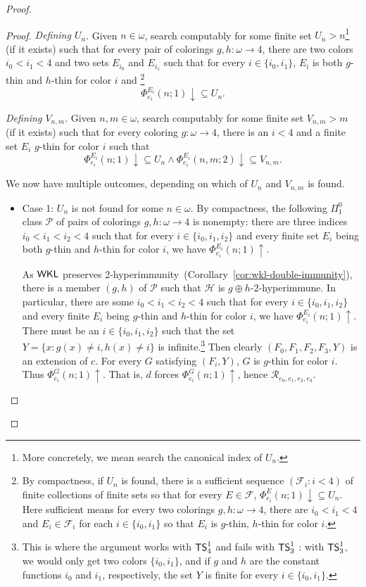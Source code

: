 \documentclass{amsart}
\theoremstyle{definition}
\theoremstyle{remark}
\numberwithin{equation}{section}
\theoremstyle{noparens}
\def\propertyL{2-hyperimmunity}
\def\hyper{2-hyperimmune}
\def\mcal{\mathcal}
\newcommand{\Hcal}{\mathcal{H}}
\newcommand{\Pcal}{\mathcal{P}}
\newcommand{\Rcal}{\mathcal{R}}
\newcommand{\s}[1]{\ensuremath{\sf{#1}}}
\DeclareMathOperator{\wkl}{\s{WKL}}
\DeclareMathOperator{\ts}{\s{TS}}
\begin{document}
\begin{proof}
\begin{proof}
\emph{Defining $U_n$}.
Given $n \in \omega$, search computably for some
finite set $U_n>n$\footnote{More concretely, we mean search the canonical index of $U_n$.} (if it exists) such that
for every pair of colorings
$g,h:\omega\rightarrow 4$, there are two colors $i_0 < i_1 < 4$
and two sets $E_{i_0}$ and $E_{i_1}$ such that for every $i \in \{i_0, i_1 \}$,
$E_i $ is both $g$-thin and $h$-thin for color $i$  and
\footnote{By compactness, if $U_n$ is found, there is a sufficient
sequence $(\mcal{F}_i:i<4)$
of finite  collections
  of finite sets so that for every $E\in\mcal{F}$,
$\Phi_{e_i}^{E}(n;1)\downarrow\subseteq U_n$.
Here sufficient means for every two colorings $g,h:\omega\rightarrow 4$,
there are $i_0<i_1<4$ and $E_i\in\mcal{F}_i$ for each $i\in \{i_0,i_1\}$
so that $E_i$ is $g$-thin, $h$-thin for color $i$. }
$$
\Phi_{e_i}^{   E_i}(n;1) \downarrow \subseteq U_n.
$$

\emph{Defining $V_{n,m}$}. Given $n, m \in \omega$, search  computably for some
finite  set $V_{n,m}>m$ (if it exists) such that for every
coloring $g:\omega\rightarrow 4 $, there is an $i < 4$ and a finite set $E_i $ $g$-thin for color $i$
such that
$$
\Phi_{e_i}^{  E_i}(n;1) \downarrow \subseteq U_n
	\wedge \Phi_{e_i}^{ E_i}(n, m;2) \downarrow \subseteq V_{n,m}.
$$
\smallskip

We now have multiple outcomes, depending on which of $U_n$ and $V_{n,m}$ is found.

\begin{itemize}
	\item Case 1: $U_n$ is not found for some $n \in \omega$. By compactness, the following $\Pi^{0}_1$ class
$\Pcal$ of  pairs of colorings
$g,h:\omega\rightarrow 4$
is nonempty:	
	 there are three indices $i_0 < i_1 < i_2 < 4$ such that for every $i \in \{i_0, i_1, i_2\}$
	and every finite set $E_i$ being both $g$-thin and $h$-thin for color $i$, we have
	$\Phi_{e_i}^{E_i}(n;1) \uparrow$.

	As $\wkl$ preserves \propertyL\
	(Corollary~\ref{cor:wkl-double-immunity}), there is a member $(g,h)$
 of $\Pcal$ such that
	$\Hcal$ is $g\oplus h$-\hyper.
	In particular, there are some $i_0 < i_1 < i_2 < 4$ such that for every $i \in \{i_0, i_1, i_2\}$
	and every  finite $E_i $ being $g$-thin and $h$-thin for color $i$, we have
	$\Phi_{e_i}^{E_i}(n;1) \uparrow$.
	There must be an $i\in \{i_0,i_1,i_2\}$ such that
the set
$Y=\{x:g(x)\ne i,h(x)\ne i\}$ is infinite.\footnote{This is where the argument works with $\ts^1_4$ and fails with $\ts^1_3$ : with $\ts^1_3$, we would only get two colors $\{i_0, i_1\}$, and if $g$ and $h$ are the constant functions $i_0$ and $i_1$, respectively, the set $Y$ is finite for every $i \in \{i_0, i_1\}$.}  Then clearly
	$(F_0, F_1, F_2, F_3, Y)$ is an extension of $c$.
For every $G$ satisfying $(F_i,Y)$, $G$ is $g$-thin for color $i$.
 Thus  $\Phi_{e_i}^G(n;1)\uparrow$. That is, $d$ forces $\Phi_{e_i}^G(n;1)\uparrow$,
 hence $\Rcal_{e_0, e_1, e_2, e_3}$.
	\bigskip


\end{itemize}
\end{proof}
\end{proof}
\end{document}
